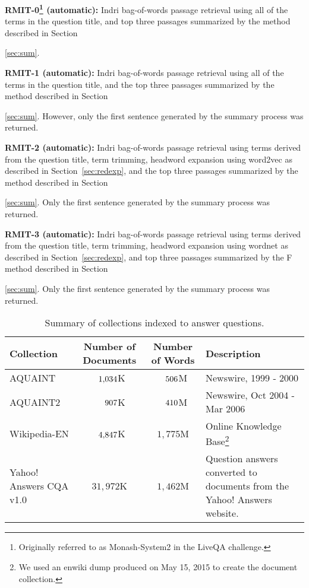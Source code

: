 \documentclass[a4paper,10pt,conference,compsocconf,final]{IEEEtran}
\newcommand\method[1]{{\sf\small{#1}}}
\def\D{\hphantom{1}}
\def\C{\hphantom{1,}}
\begin{document}
\noindent\textbf{RMIT-0\footnote{Originally referred to as
Monash-System2 in the LiveQA challenge.}
(automatic): } Indri bag-of-words passage retrieval using all of the
terms in the question title, and top three passages summarized by the method
described in Section~{\ref{sec:sum}.

\medskip

\noindent\textbf{RMIT-1 (automatic): } Indri bag-of-words passage
retrieval using all of the terms in the question title, and the
top three passages summarized by the method described in
Section~{\ref{sec:sum}.
However, only the first sentence generated by the summary process was
returned.

\medskip

\noindent\textbf{RMIT-2 (automatic): } Indri bag-of-words passage
retrieval using terms derived from the question title, term trimming,
headword expansion using {\method{word2vec}} as described in
Section~{\ref{sec:redexp}}, and the top three passages summarized by
the method described in Section~{\ref{sec:sum}.
Only the first sentence generated by the summary process was
returned.

\medskip

\noindent\textbf{RMIT-3 (automatic): } Indri bag-of-words passage
retrieval using terms derived from the question title, term trimming,
headword expansion using \method{wordnet} as described in 
Section~{\ref{sec:redexp}}, and top three passages summarized by the F
method described in Section~{\ref{sec:sum}.  Only the first
sentence generated by the summary process was returned.

\medskip

\begin{table*}[!t]
\centering
\caption{Summary of collections indexed to answer questions.\label{tbl:col}}
\begin{tabular}{p{35mm}ccp{50mm}}
\toprule
{\bf Collection} & {\bf Number of Documents} & {\bf Number of Words} & {\bf Description} \\
\midrule
AQUAINT & $\D1{,}034$K & $\C506$M & Newswire, 1999 - 2000 \\
AQUAINT2 & $\D\C907$K & $\C410$M & Newswire, Oct 2004 - Mar 2006 \\
Wikipedia-EN & $\D4{,}847$K & $1{,}775$M & Online Knowledge Base\footnote{We used an enwiki dump produced on May 15, 2015 to create the document collection.} \\
Yahoo! Answers CQA v1.0 & $31{,}972$K & $1{,}462$M & Question answers converted to documents from the Yahoo! Answers website.
\\
\bottomrule
\end{tabular}
\end{table*}

}}}}
\end{document}
